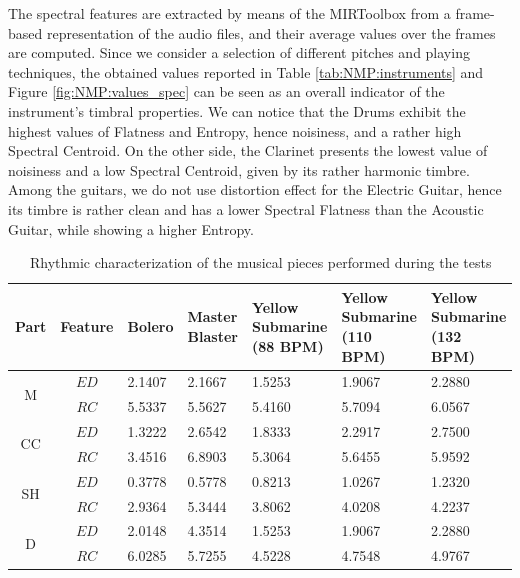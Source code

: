 The spectral features are extracted by means of the MIRToolbox \cite{Lartillot2007} from a frame-based representation of the audio files, and their average values over the frames are computed. Since we consider a selection of different pitches and playing techniques, the obtained values reported in Table \ref{tab:NMP:instruments} and Figure \ref{fig:NMP:values_spec} can be seen as an overall indicator of the instrument's timbral properties. We can notice that the Drums exhibit the highest values of Flatness and Entropy, hence noisiness, and a rather high Spectral Centroid. On the other side, the Clarinet presents the lowest value of noisiness and a low Spectral Centroid, given by its rather harmonic timbre. Among the guitars, we do not use distortion effect for the Electric Guitar, hence its timbre is rather clean and has a lower Spectral Flatness than the Acoustic Guitar, while showing a higher Entropy.

\begin{table}[tb]
  \caption{Rhythmic characterization of the musical pieces performed during the tests}
  \centering %
  \label{tab:NMP:pieces}  
  \bgroup
  \def\arraystretch{1.5}
 \begin{tabular}{||c|c|p{1.4cm}|p{1.4cm}|p{1.8cm}|p{1.8cm}|p{1.8cm}||}
 \hline
 \hline
Part &  Feature & Bolero & Master Blaster & Yellow Submarine (88 BPM) & Yellow Submarine (110 BPM) & Yellow Submarine (132 BPM)\\
 \hline
 \hline
 \multirow{2}{*}{M}& $ED$ & 2.1407 & 2.1667 & 1.5253 & 1.9067 & 2.2880 \\
           & $RC$ & 5.5337 & 5.5627 & 5.4160 & 5.7094 & 6.0567 \\
\hline
\multirow{2}{*}{CC}& $ED$ & 1.3222 & 2.6542 & 1.8333 & 2.2917 & 2.7500 \\
          & $RC$ & 3.4516 & 6.8903 & 5.3064 & 5.6455 & 5.9592\\
\hline
\multirow{2}{*}{SH}& $ED$ & 0.3778 & 0.5778 & 0.8213 & 1.0267 & 1.2320 \\
          & $RC$ & 2.9364 & 5.3444 & 3.8062 & 4.0208 & 4.2237\\
\hline
\multirow{2}{*}{D}& $ED$ & 2.0148 & 4.3514 & 1.5253 & 1.9067 & 2.2880 \\
         & $RC$ & 6.0285 & 5.7255 & 4.5228 & 4.7548 &  4.9767 \\
 \hline
 \hline
   \end{tabular}
   \egroup
\end{table}




